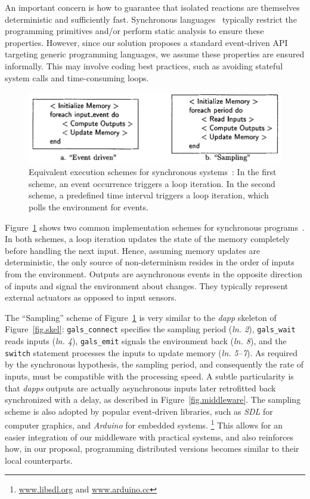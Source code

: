 \documentclass[sigplan,screen]{acmart}
\newcommand{\lin}[1]{(\emph{ln. #1}\xspace)}
\newcommand{\dapp}{\emph{dapp}\xspace}
\newcommand{\dapps}{\emph{dapps}\xspace}
\begin{document}
An important concern is how to guarantee that isolated reactions are themselves
deterministic and sufficiently fast.
Synchronous languages~\cite{langs} typically restrict the programming
primitives and/or perform static analysis to ensure these properties.
However, since our solution proposes a standard event-driven API targeting
generic programming languages, we assume these properties are ensured
informally.
This may involve coding best practices, such as avoiding stateful system calls
and time-consuming loops.

\begin{figure}[t]
  \centering
  \includegraphics[width=\linewidth]{schemes}
  \caption{
    \label{fig.schemes}
    Equivalent execution schemes for synchronous systems~\cite{schemes}:
    In the first scheme, an event occurrence triggers a loop iteration.
    In the second scheme, a predefined time interval triggers a loop iteration,
    which polls the environment for events.
  }
\end{figure}

Figure~\ref{fig.schemes} shows two common implementation schemes for
synchronous programs~\cite{schemes}.
In both schemes, a loop iteration updates the state of the memory completely
before handling the next input.
Hence, assuming memory updates are deterministic, the only source of
non-determinism resides in the order of inputs from the environment.
Outputs are asynchronous events in the opposite direction of inputs and
signal the environment about changes.
They typically represent external actuators as opposed to input sensors.

The ``Sampling'' scheme of Figure~\ref{fig.schemes} is very similar to the
\dapp skeleton of Figure~\ref{fig.skel}:
    \texttt{gals\_connect} specifies the sampling period \lin{2},
    \texttt{gals\_wait} reads inputs \lin{4},
    \texttt{gals\_emit} signals the environment back \lin{8}, and
    the \texttt{switch} statement processes the inputs to update memory \lin{5--7}.
As required by the synchronous hypothesis, the sampling period, and
consequently the rate of inputs, must be compatible with the processing speed.
A subtle particularity is that \dapps outputs are actually asynchronous inputs
later retrofitted back synchronized with a delay, as described in
Figure~\ref{fig.middleware}.
%
The sampling scheme is also adopted by popular event-driven libraries, such as
\emph{SDL} for computer graphics, and \emph{Arduino} for embedded systems.%
\footnote{\url{www.libsdl.org} and \url{www.arduino.cc}}
This allows for an easier integration of our middleware with practical systems,
and also reinforces how, in our proposal, programming distributed versions
becomes similar to their local counterparts.
\end{document}
